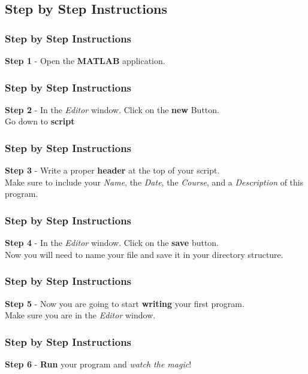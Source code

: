 \documentclass[fleqn]{ltx-talk} %
\newcommand{\sectionIIIsubsectionIIItitle}{Step by Step Instructions}
\begin{document}
		\subsection{\sectionIIIsubsectionIIItitle}\label{sectionIIIsubsectionIII}

			\begin{frame}
				\frametitle{\sectionIIIsubsectionIIItitle}

				\textbf{Step 1} - Open the {\bfseries  MATLAB} application.
				
				\btVFill
			\end{frame}

			\begin{frame}
				\frametitle{\sectionIIIsubsectionIIItitle}
%
				\textbf{Step 2} - In the {\itshape  Editor} window. Click on the {\bfseries  new } Button. \vspace{3mm}\\ \hspace*{12mm}Go down to {\bfseries  script}
				
				\btVFill
			\end{frame}

			\begin{frame}
				\frametitle{\sectionIIIsubsectionIIItitle}

				\textbf{Step 3} - Write a proper {\bfseries  header} at the top of your script. \vspace{3mm}\\ Make sure to include your {\itshape  Name}, the {\itshape  Date}, the {\itshape  Course}, and a {\itshape  Description} of this program.
				
				\btVFill
			\end{frame}

			\begin{frame}
				\frametitle{\sectionIIIsubsectionIIItitle}

				\textbf{Step 4} - In the {\itshape  Editor} window. Click on the {\bfseries  save} button. \vspace{3mm}\\ Now you will need to name your file and save it in your directory structure.
				
				\btVFill
			\end{frame}

			\begin{frame}
				\frametitle{\sectionIIIsubsectionIIItitle}

				\textbf{Step 5} - Now you are going to start {\bfseries  writing} your first program. \vspace{3mm}\\ Make sure you are in the {\itshape Editor} window.
				
				\btVFill
			\end{frame}

			\begin{frame}
				\frametitle{\sectionIIIsubsectionIIItitle}

				\textbf{Step 6} - {\bfseries Run} your program and {\itshape  watch the magic}!
				
				\btVFill
			\end{frame}
\end{document}
